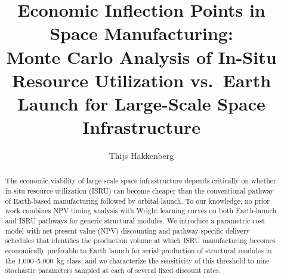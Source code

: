 \documentclass[preprint,12pt]{elsarticle}
\begin{document}
\begin{frontmatter}

\title{Economic Inflection Points in Space Manufacturing:\\ Monte Carlo Analysis of In-Situ Resource Utilization vs.\ Earth Launch for Large-Scale Space Infrastructure}

\author[dyson]{Thijs Hakkenberg}

\address[dyson]{Project Dyson, Open Research Initiative}

\begin{abstract}
The economic viability of large-scale space infrastructure depends critically on whether in-situ resource utilization (ISRU) can become cheaper than the conventional pathway of Earth-based manufacturing followed by orbital launch. To our knowledge, no prior work combines NPV timing analysis with Wright learning curves on both Earth-launch and ISRU pathways for generic structural modules. We introduce a parametric cost model with net present value (NPV) discounting and pathway-specific delivery schedules that identifies the production volume at which ISRU manufacturing becomes economically preferable to Earth launch for serial production of structural modules in the 1{,}000--5{,}000~kg class, and we characterize the sensitivity of this threshold to nine stochastic parameters sampled at each of several fixed discount rates.


\end{abstract}
\end{frontmatter}
\end{document}
